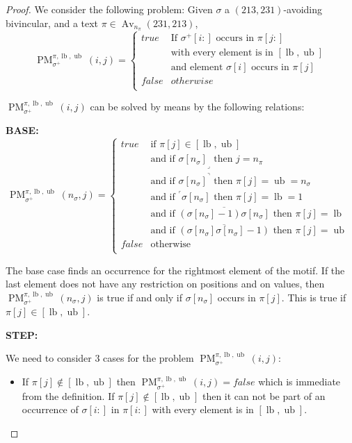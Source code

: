 \documentclass[a4paper]{llncs}
\DeclareMathOperator{\Avd}{Av}
\newcommand\Av[2]{\Avd_{{#1}}({#2})}
\newcommand{\ptext}{\pi}
\newcommand{\pmotif}{\sigma}
\newcommand{\pbmotif}{\pmotif^+}
\DeclareMathOperator{\PMa}{PM}
\newcommand{\PM}[6]{\PMa_{{#1}}^{{#2},{#3},{#4}}({#5},{#6})}
\DeclareMathOperator{\lb}{lb}
\DeclareMathOperator{\ub}{ub}
\begin{document}
\begin{proof}
We consider the following problem:
Given $\pmotif$ a $(213,231)$-avoiding bivincular, and a text $\ptext \in \Av{n_\ptext}{231,213}$,
$$
\PM{\pbmotif}{\ptext}{\lb}{\ub}{i}{j}=
\begin{cases}
	true 	& \text{If $\pbmotif[i:]$ occurs in $\ptext[j:]$}\\
			& \text{with every element is in $[\lb,\ub]$}\\
			& \text{and element $\pmotif[i]$ occurs in $\ptext[j]$ }\\
	false 	& otherwise\\
\end{cases}
$$

$\PM{\pbmotif}{\ptext}{\lb}{\ub}{i}{j}$ can be solved by means by the following relations:

\noindent\textbf{BASE:} \\
$$
\PM{\pbmotif}{\ptext}{\lb}{\ub}{n_\pmotif}{j}=
\begin{cases}
	true 	& \text{if $\ptext[j] \in [\lb,\ub ]$}\\
			& \text{and if ${\pmotif[n_\pmotif]}_\lrcorner$ then $j=n_\ptext$}\\
			& \text{and if ${\pmotif[n_\pmotif]}^\urcorner$ then $\ptext[j]=\ub=n_\pmotif$}\\
			& \text{and if  $^\ulcorner{\pmotif[n_\pmotif]}$ then $\ptext[j]=\lb=1$ } \\
			& \text{and if  $\overline{(\pmotif[n_\pmotif]-1)\pmotif[n_\pmotif] }$ then $\ptext[j]=\lb$ }  \\
			& \text{and if  $\overline{(\pmotif[n_\pmotif]\pmotif[n_\pmotif]-1)}$ then $\ptext[j]=\ub$}  \\

	false	& \text{otherwise} \\
\end{cases}
$$

The base case finds an occurrence for the rightmost element of the motif. If the last element does not have any restriction on positions and on values, then $\PM{\pbmotif}{\ptext}{\lb}{\ub}{n_\pmotif}{j}$ is true if and only if $\pmotif[n_\pmotif]$ occurs in $\ptext[j]$. This is true if $\ptext[j] \in [\lb,\ub]$. 

\noindent\textbf{STEP:} 

We need to consider $3$ cases for the problem $\PM{\pbmotif}{\ptext}{\lb}{\ub}{i}{j}$:
\begin{itemize}
	\item If $\ptext[j] \notin [\lb,\ub]$ then
	$
	\PM{\pbmotif}{\ptext}{\lb}{\ub}{i}{j} = false
	$
	which is immediate from the definition. 
	If $\ptext[j] \notin [\lb,\ub]$ then it can not be part of an 
	occurrence of  $\pmotif[i:]$ in $\ptext[i:]$ with every element is 
	in $[\lb,\ub]$.
	

\end{itemize}
\end{proof}
\end{document}
